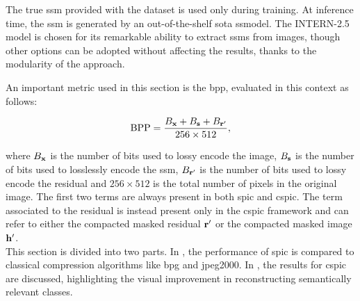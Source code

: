 The true \gls{ssm} provided with the dataset is used only during training. At inference time, the \gls{ssm} is generated by an out-of-the-shelf \gls{sota} \gls{ssmodel}. The INTERN-2.5 model \cite{Wang2022internimage} is chosen for its remarkable ability to extract \glspl{ssm} from images, though other options can be adopted without affecting the results, thanks to the modularity of the approach.

An important metric used in this section is the \gls{bpp}, evaluated in this context as follows:

\begin{equation} \text{BPP} = \frac{B_{\mathbf{x}} + B_{\mathbf{s}} + B_{\mathbf{r}'}}{256\times512}, \end{equation}

where $B_{\mathbf{x}}$ is the number of bits used to lossy encode the image, $B_{\mathbf{s}}$ is the number of bits used to losslessly encode the \gls{ssm}, $B_{\mathbf{r}'}$ is the number of bits used to lossy encode the residual and $256\times512$ is the total number of pixels in the original image. The first two terms are always present in both \gls{spic} and \gls{cspic}. The term associated to the residual is instead present only in the \gls{cspic} framework and can refer to either the compacted masked residual $\mathbf{r}'$ or the compacted masked image $\mathbf{h}'$.\\

This section is divided into two parts. In , the performance of \gls{spic} is compared to classical compression algorithms like \gls{bpg} and \gls{jpeg2000}. In , the results for \gls{cspic} are discussed, highlighting the visual improvement in reconstructing semantically relevant classes.


